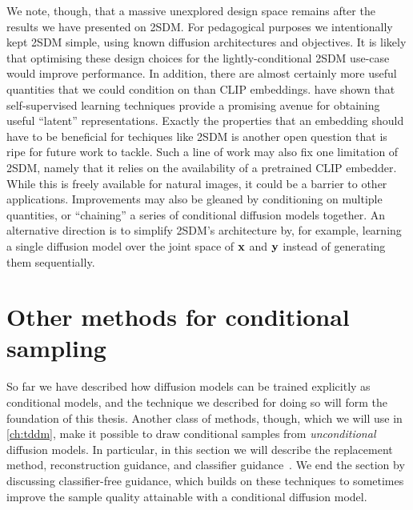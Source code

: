 We note, though, that a massive unexplored design space remains after the results we have presented on 2SDM. For pedagogical purposes we intentionally kept 2SDM simple, using known diffusion architectures and objectives. It is likely that optimising these design choices for the lightly-conditional 2SDM use-case would improve performance. In addition, there are almost certainly more useful quantities that we could condition on than CLIP embeddings. 
\citet{bao2022conditional,hu2022self} have shown that self-supervised learning techniques provide a promising avenue for obtaining useful ``latent'' representations. Exactly the properties that an embedding should have to be beneficial for techiques like 2SDM is another open question that is ripe for future work to tackle. Such a line of work may also fix one limitation of 2SDM, namely that it relies on the availability of a pretrained CLIP embedder. While this is freely available for natural images, it could be a barrier to other applications. Improvements may also be gleaned by conditioning on multiple quantities, or ``chaining'' a series of conditional diffusion models together. An alternative direction is to simplify 2SDM's architecture by, for example, learning a single diffusion model over the joint space of ${\mathbf{x}}$ and ${\mathbf{y}}$ instead of generating them sequentially.

\section{Other methods for conditional sampling} \label{sec:other-methods-for-conditional-sampling}
So far we have described how diffusion models can be trained explicitly as conditional models, and the technique we described for doing so will form the foundation of this thesis. Another class of methods, though, which we will use in \cref{ch:tddm}, make it possible to draw conditional samples from \textit{unconditional} diffusion models. In particular, in this section we will describe the replacement method, reconstruction guidance, and classifier guidance~\citep{song2020score,kadkhodaie2020solving,mittal2021symbolic,ho2022video}. We end the section by discussing classifier-free guidance, which builds on these techniques to sometimes improve the sample quality attainable with a conditional diffusion model.


